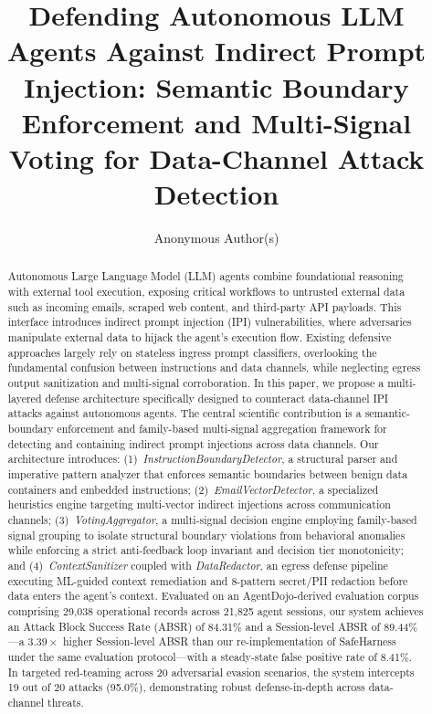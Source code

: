 \documentclass[runningheads]{llncs}
\begin{document}
\title{Defending Autonomous LLM Agents Against Indirect Prompt Injection: Semantic Boundary Enforcement and Multi-Signal Voting for Data-Channel Attack Detection}

\author{Anonymous Author(s)}

\maketitle

\begin{abstract}
Autonomous Large Language Model (LLM) agents combine foundational reasoning with external tool execution, exposing critical workflows to untrusted external data such as incoming emails, scraped web content, and third-party API payloads. This interface introduces indirect prompt injection (IPI) vulnerabilities, where adversaries manipulate external data to hijack the agent's execution flow. Existing defensive approaches largely rely on stateless ingress prompt classifiers, overlooking the fundamental confusion between instructions and data channels, while neglecting egress output sanitization and multi-signal corroboration. 
In this paper, we propose a multi-layered defense architecture specifically designed to counteract data-channel IPI attacks against autonomous agents. The central scientific contribution is a semantic-boundary enforcement and family-based multi-signal aggregation framework for detecting and containing indirect prompt injections across data channels. Our architecture introduces: (1)~\textit{InstructionBoundaryDetector}, a structural parser and imperative pattern analyzer that enforces semantic boundaries between benign data containers and embedded instructions; (2)~\textit{EmailVectorDetector}, a specialized heuristics engine targeting multi-vector indirect injections across communication channels; (3)~\textit{VotingAggregator}, a multi-signal decision engine employing family-based signal grouping to isolate structural boundary violations from behavioral anomalies while enforcing a strict anti-feedback loop invariant and decision tier monotonicity; and (4)~\textit{ContextSanitizer} coupled with \textit{DataRedactor}, an egress defense pipeline executing ML-guided context remediation and 8-pattern secret/PII redaction before data enters the agent's context. 
Evaluated on an AgentDojo-derived evaluation corpus comprising 29,038 operational records across 21,825 agent sessions, our system achieves an Attack Block Success Rate (ABSR) of 84.31\% and a Session-level ABSR of 89.44\%---a $3.39\times$ higher Session-level ABSR than our re-implementation of SafeHarness under the same evaluation protocol---with a steady-state false positive rate of 8.41\%. In targeted red-teaming across 20 adversarial evasion scenarios, the system intercepts 19 out of 20 attacks (95.0\%), demonstrating robust defense-in-depth across data-channel threats.

\end{abstract}
\end{document}
